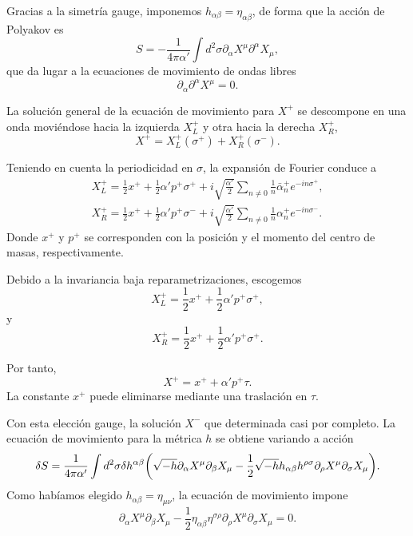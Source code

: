 Gracias a la simetría gauge, imponemos $h_{\alpha\beta}=\eta_{\alpha\beta}$, de forma que 
la acción de Polyakov es
\begin{equation}
  S = -\frac{1}{4\pi\alpha'} \int d^2\sigma \partial_\alpha X^\mu \partial^\alpha X_\mu,
\end{equation}
que da lugar a la ecuaciones de movimiento de ondas libres
\begin{equation}
  \partial_\alpha \partial^\alpha X^\mu=0.
\end{equation}

La solución general de la ecuación de movimiento para $X^+$ se descompone
en una onda moviéndose hacia la izquierda $X^+_L$ y otra hacia la derecha $X^+_R$,
\begin{equation}
   X^+ =X^+_L(\sigma^+) + X^+_R(\sigma^-).
\end{equation}

Teniendo en cuenta la periodicidad en $\sigma$, la expansión de Fourier conduce a
\begin{equation}
  \begin{gathered}
    X^+_L=\frac 1 2 x^+ + \frac 1 2 \alpha' p^+ \sigma^+ + i\sqrt{\frac{\alpha'}{2}}\sum_{n\neq 0} \frac{1}{n}\bar \alpha^+_n e^{-in\sigma^+},\\
    X^+_R=\frac 1 2 x^+ + \frac 1 2 \alpha' p^+ \sigma^- +i\sqrt{\frac{\alpha'}{2}}\sum_{n\neq 0} \frac{1}{n}\alpha^+_n e^{-in\sigma^-}.
  \end{gathered}
\end{equation}
Donde $x^+$ y $p^+$ se corresponden con la posición y el momento del centro de masas, respectivamente.


Debido a la invariancia baja reparametrizaciones, escogemos
\begin{equation}
  X^+_L=\frac 1 2 x^+ + \frac 1 2 \alpha' p^+ \sigma^+,
\end{equation}
y
\begin{equation}
  X^+_R=\frac 1 2 x^+ + \frac 1 2 \alpha' p^+ \sigma^+.
\end{equation}

Por tanto, 
\begin{equation}
  X^+ = x^+ + \alpha' p^+ \tau.
\end{equation}
La constante $x^+$ puede eliminarse mediante una traslación en $\tau$.

Con esta elección gauge, la solución $X^-$ que determinada casi por completo.
La ecuación de movimiento para la métrica $h$ se obtiene variando a acción
\begin{equation}
  \delta S = \frac{1}{4\pi\alpha'}\int d^2\sigma \delta h^{\alpha\beta}
  \qty(
  \sqrt{-h}\partial_\alpha X^\mu \partial_\beta X_\mu -
  \frac 1 2 \sqrt{-h}h_{\alpha\beta}h^{\rho\sigma} \partial_\rho X^\mu \partial_\sigma X_\mu).
\end{equation}
Como habíamos elegido $h_{\alpha\beta}=\eta_{\mu\nu}$, la ecuación de movimiento impone
\begin{equation}
  \partial_\alpha X^\mu \partial_\beta X_\mu - \frac 1 2 \eta_{\alpha\beta} \eta^{\sigma\rho} 
  \partial_\rho X^\mu  \partial_\sigma X_\mu = 0.
\end{equation}

